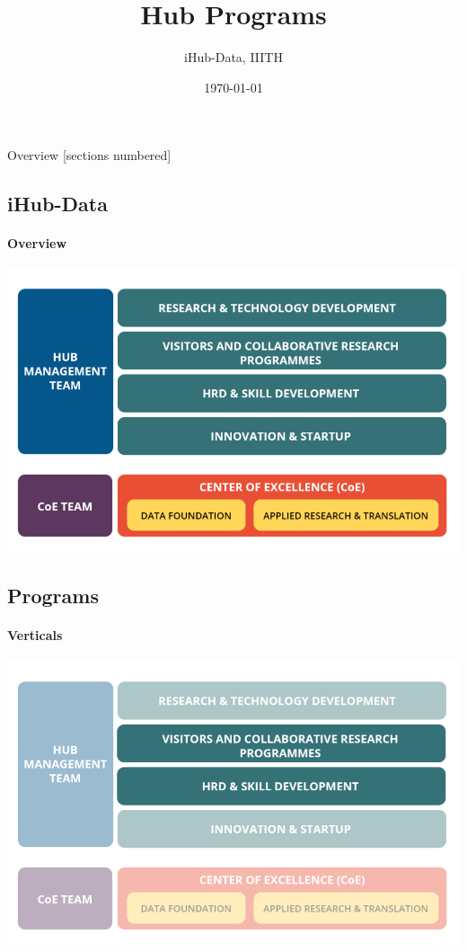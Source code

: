 \documentclass[aspectratio=169]{beamer}
\title{Hub Programs}
\subtitle{iHub-Data, IIITH}
\date{\today}
\begin{document}
\titleframe

\begin{frame}{Overview}
  [sections numbered]
  \tableofcontents[hideallsubsections]
\end{frame}


\subsection{iHub-Data}
\begin{frame}{\insertsubsectionhead}
  \framesubtitle{Overview}
  \includegraphics[scale=0.3]{images/overview.png}
\end{frame}

\subsection{Programs}
\begin{frame}{\insertsubsectionhead}
  \framesubtitle{Verticals}
  \includegraphics[scale=0.3]{images/overview-1.png}
\end{frame}
\end{document}

